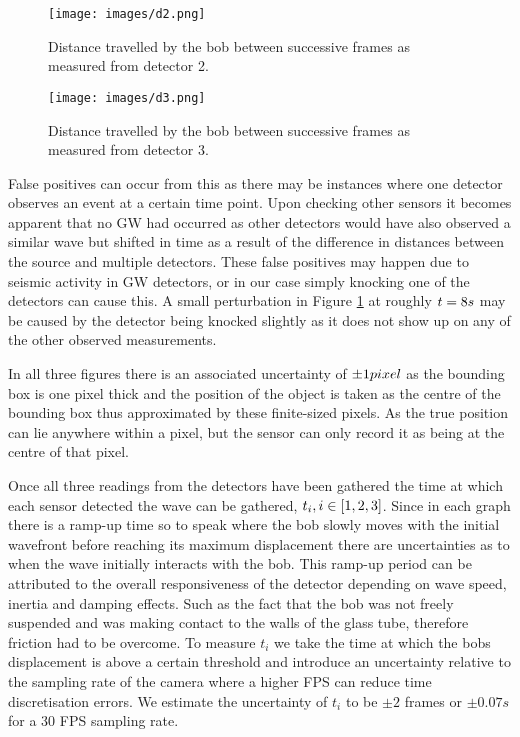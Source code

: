 \begin{figure}[h!]
    \centering
    \texttt{[image: images/d2.png]}
    \caption{Distance travelled by the bob between successive frames as measured from detector 2.}
    \label{fig:d2}
\end{figure}

\begin{figure}[h!]
    \centering
    \texttt{[image: images/d3.png]}
    \caption{Distance travelled by the bob between successive frames as measured from detector 3.}
    \label{fig:d3}
\end{figure}


False positives can occur from this as there may be instances where one detector observes an event at a certain time point. Upon checking other sensors it becomes apparent that no GW had occurred as other detectors would have also observed a similar wave but shifted in time as a result of the difference in distances between the source and multiple detectors. These false positives may happen due to seismic activity in GW detectors, or in our case simply knocking one of the detectors can cause this. A small perturbation in Figure \ref{fig:d2} at roughly $t = 8 \space s$ may be caused by the detector being knocked slightly as it does not show up on any of the other observed measurements.

In all three figures there is an associated uncertainty of $\pm 1\space pixel$ as the bounding box is one pixel thick and the position of the object is taken as the centre of the bounding box thus approximated by these finite-sized pixels. As the true position can lie anywhere within a pixel, but the sensor can only record it as being at the centre of that pixel.

Once all three readings from the detectors have been gathered the time at which each sensor detected the wave can be gathered, $t_i,\space i \space\in \space [1,2,3]$. Since in each graph there is a ramp-up time so to speak where the bob slowly moves with the initial wavefront before reaching its maximum displacement there are uncertainties as to when the wave initially interacts with the bob. This ramp-up period can be attributed to the overall responsiveness of the detector depending on wave speed, inertia and damping effects. Such as the fact that the bob was not freely suspended and was making contact to the walls of the glass tube, therefore friction had to be overcome. To measure $t_i$ we take the time at which the bobs displacement is above a certain threshold and introduce an uncertainty relative to the sampling rate of the camera where a higher FPS can reduce time discretisation errors. We estimate the uncertainty of $t_i$ to be $\pm2$ frames or $\pm0.07s$ for a 30 FPS sampling rate.


